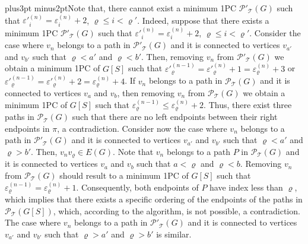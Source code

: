 \documentclass[10pt]{article}
\def\yskip{\penalty-50\vskip3pt plus3pt minus2pt}
\def\y{\yskip}
\begin{document}
{\y Note that, there cannot exist a minimum 1PC
$\mathcal{P'_{\mathcal{T}}}(G)$ such that $\varepsilon'^{(n)}_i =
\varepsilon^{(n)}_i +2$, $\varrho \leq i < \varrho'$. Indeed,
suppose that there exists a minimum 1PC
$\mathcal{P'_{\mathcal{T}}}(G)$ such that $\varepsilon'^{(n)}_i =
\varepsilon^{(n)}_i +2$, $\varrho \leq i < \varrho'$. Consider the
case where $v_n$ belongs to a path in
$\mathcal{P'_{\mathcal{T}}}(G)$ and it is connected to vertices
$v_{a'}$ and $v_{b'}$ such that $\varrho<a'$ and $\varrho<b'$.
Then, removing $v_n$ from $\mathcal{P'_{\mathcal{T}}}(G)$ we
obtain a minimum 1PC of $G[S]$ such that
$\varepsilon'^{(n-1)}_\varrho=\varepsilon'^{(n)}_\varrho
+1=\varepsilon^{(n)}_\varrho+3$ or
$\varepsilon'^{(n-1)}_\varrho=\varepsilon'^{(n)}_\varrho
+2=\varepsilon^{(n)}_\varrho+4$. If $v_n$ belongs to a path in
$\mathcal{P_{\mathcal{T}}}(G)$ and it is connected to vertices
$v_a$ and $v_b$, then removing $v_n$ from
$\mathcal{P_{\mathcal{T}}}(G)$ we obtain a minimum 1PC of $G[S]$
such that $\varepsilon^{(n-1)}_\varrho \leq
\varepsilon^{(n)}_\varrho +2$. Thus, there exist three paths in
$\mathcal{P_{\mathcal{T}}}(G)$ such that there are no left
endpoints between their right endpoints in $\pi$, a contradiction.
Consider now the case where $v_n$ belongs to a path in
$\mathcal{P'_{\mathcal{T}}}(G)$ and it is connected to vertices
$v_{a'}$ and $v_{b'}$ such that $\varrho<a'$ and $\varrho>b'$.
Then, $v_nv_\varrho \in E(G)$. Note that $v_n$ belongs to a path
$P$ in $\mathcal{P_{\mathcal{T}}}(G)$ and it is connected to
vertices $v_a$ and $v_b$ such that $a<\varrho$ and $\varrho<b$.
Removing $v_n$ from $\mathcal{P_{\mathcal{T}}}(G)$ should result
to a minimum 1PC of $G[S]$ such that $\varepsilon^{(n-1)}_\varrho
= \varepsilon^{(n)}_\varrho + 1$. Consequently, both endpoints of
$P$ have index less than $\varrho$, which implies that there
exists a specific ordering of the endpoints of the paths in
$\mathcal{P_{\mathcal{T}}}(G[S])$, which, according to the
algorithm, is not possible, a contradiction. The case where $v_n$
belongs to a path in $\mathcal{P'_{\mathcal{T}}}(G)$ and it is
connected to vertices $v_{a'}$ and $v_{b'}$ such that $\varrho>a'$
and $\varrho>b'$ is similar.

}
\end{document}
